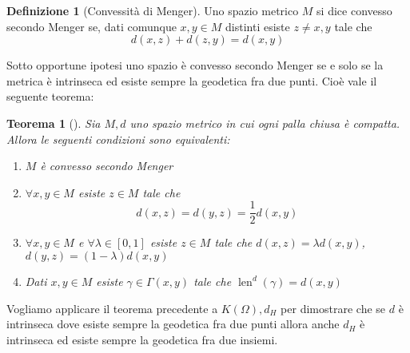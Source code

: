 \documentclass[a4paper,10pt]{article}
\newcounter{counter1}
\theoremstyle{plain}
\newtheorem{myteo}[counter1]{Teorema}
\theoremstyle{definition}
\newtheorem{mydef}[counter1]{Definizione}
\theoremstyle{remark}
\newcommand{\bra}[1]{\left[#1\right]}
\DeclareMathOperator{\len}{len}
\begin{document}
\newpage
\begin{mydef}[Convessità di Menger]
  Uno spazio metrico $M$ si dice convesso secondo Menger se, dati
  comunque $x,y \in M$ distinti esiste $z\neq x,y$ tale che
  \[ d(x,z) + d(z,y) = d(x,y) \]
\end{mydef}


Sotto opportune ipotesi uno spazio è convesso secondo Menger se e solo
se la metrica è intrinseca ed esiste sempre la geodetica fra due
punti. Cioè vale il seguente teorema:

\begin{myteo}[{\cite[Teorema 2.6.2]{papadopoulos2013metric}}]
  Sia $M,d$ uno spazio metrico in cui ogni palla chiusa è
  compatta. Allora le seguenti condizioni sono equivalenti:
  \begin{enumerate}
  \item $M$ è convesso secondo Menger
  \item $\forall x,y \in M$ esiste $z\in M$ tale che 
    \[ d(x,z) = d(y,z) = \frac{1}{2} d(x,y) \]
  \item $\forall x,y \in M$ e $\forall \lambda \in \bra{0,1}$ esiste
    $z\in M$ tale che $d(x,z) = \lambda d(x,y)$, $d(y,z) = (1-\lambda)
    d(x,y)$ 
  \item Dati $x,y \in M$ esiste $\gamma \in \Gamma(x,y)$ tale che
    $\len ^d (\gamma) = d(x,y)$
  \end{enumerate}
\end{myteo}

Vogliamo applicare il teorema precedente a $K(\Omega),d_H$ per
dimostrare che se $d$ è intrinseca dove esiste sempre la geodetica fra
due punti allora anche $d_H$ è intrinseca ed esiste sempre la
geodetica fra due insiemi.
\end{document}
